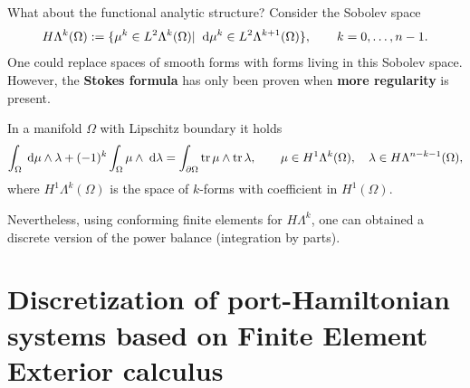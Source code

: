 \documentclass[aspectratio=169]{beamer}
\DeclareMathOperator{\tr}{tr}
\begin{document}
\begin{frame}{What about the functional analytic structure?}
Consider the Sobolev space
\begin{equation*}
	H\Lambda^k(\Omega) := \{\mu^k \in L^2 \Lambda^k(\Omega) \vert \; \d{\mu^k} \in L^2 \Lambda^{k+1}(\Omega)\}, \qquad k=0, \dots, n-1.
\end{equation*}
One could replace spaces of smooth forms with forms living in this Sobolev space. \\
However, the \textbf{Stokes formula} has only been proven when \textbf{more regularity} is present.
\begin{theorem}
	In a manifold $\Omega$ with Lipschitz boundary it holds
	\begin{equation*}
		\int_\Omega \d{\mu} \wedge \lambda + (-1)^k \int_\Omega \mu \wedge \d{\lambda} = \int_{\partial \Omega}\tr {\mu} \wedge \tr{\lambda}, \qquad \mu \in H^1\Lambda^{k}(\Omega), \quad \lambda \in H \Lambda^{n-k-1}(\Omega),
	\end{equation*}
	where $H^1\Lambda^k(\Omega)$ is the space of $k$-forms with coefficient in $H^1(\Omega)$.
\end{theorem}

Nevertheless, using conforming finite elements for $H\Lambda^k$, one can obtained a discrete version of the power balance (integration by parts).

\end{frame}

\section{Discretization of port-Hamiltonian systems based on Finite Element Exterior calculus}
\end{document}
